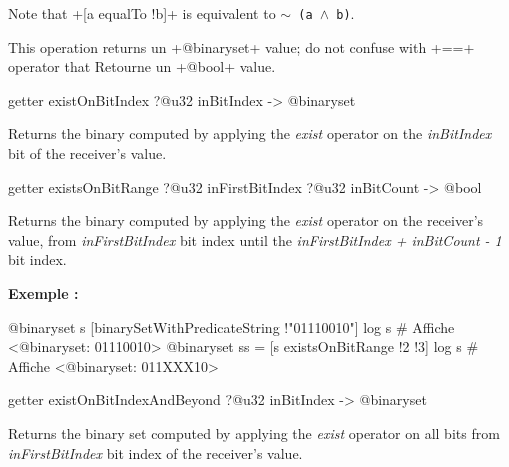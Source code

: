 Note that \ggsq+[a equalTo !b]+ is equivalent to \texttt{$\sim$ (a $\wedge$ b)}.

This operation returns un \ggsq+@binaryset+ value; do not confuse with \ggsq+==+ operator that Retourne un \ggsq+@bool+ value.








\begin{galgas4box}
getter existOnBitIndex ?@u32 inBitIndex -> @binaryset
\end{galgas4box}

Returns the binary computed by applying the \emph{exist} operator on the \emph{inBitIndex} bit of the receiver's value.







\begin{galgas4box}
getter existsOnBitRange ?@u32 inFirstBitIndex ?@u32 inBitCount -> @bool
\end{galgas4box}


Returns the binary computed by applying the \emph{exist} operator on the receiver's value, from \emph{inFirstBitIndex} bit index until the \emph{inFirstBitIndex + inBitCount - 1} bit index.


\textbf{Exemple :}
\begin{galgas4}
@binaryset s [binarySetWithPredicateString !"01110010"]
log s # Affiche <@binaryset: 01110010>
@binaryset ss = [s existsOnBitRange !2 !3]
log s # Affiche <@binaryset: 011XXX10>
\end{galgas4}








\begin{galgas4box}
getter existOnBitIndexAndBeyond ?@u32 inBitIndex -> @binaryset
\end{galgas4box}

Returns the binary set computed by applying the \emph{exist} operator on all bits from \emph{inFirstBitIndex} bit index of the receiver's value.







